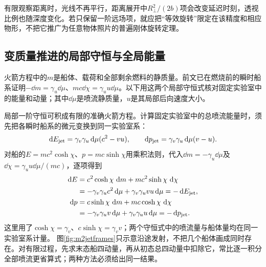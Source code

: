 有限观察距离时，光线不再平行，距离展开中$R_\perp^2/(2b)$项会改变延迟时刻，透视比例也随深度变化。若只保留一阶远场项，就应把“等效旋转”限定在该精度和相应物形，不把它推广为任意物体照片的普遍刚体旋转定理。

\subsection{变质量推进的局部守恒与全局能量}
火箭方程中的$m$是船体、载荷和全部剩余燃料的静质量。前文已在燃烧前的瞬时船系证明$-\dd m=\gamma_u\dd\mu$、$mc\dd\chi=\gamma_u u\dd\mu$。以下用这两个局部守恒式核对固定实验室中的能量和动量；其中$\dd\mu$是喷流静质量，$u$是其局部后向速度大小。

局部一阶守恒可积成有限的准确火箭方程。计算固定实验室中的总喷流能量时，须先把各瞬时船系的微元变换到同一实验室系：
\[
 \mathop{}\!\mathrm d E_{\rm jet}=\gamma_v\gamma_u\mathop{}\!\mathrm d\mu(c^2-vu),\qquad
 \mathop{}\!\mathrm d p_{\rm jet}=\gamma_v\gamma_u\mathop{}\!\mathrm d\mu(v-u).
\]
对船的$E=mc^2\cosh\chi$、$p=mc\sinh\chi$用乘积法则，代入$\dd m=-\gamma_u\dd\mu$及$\dd\chi=\gamma_u u\dd\mu/(mc)$，逐项得到
\begin{align*}
 \dd E&=c^2\cosh\chi\,\dd m+mc^2\sinh\chi\,\dd\chi\\
 &=-\gamma_v\gamma_u c^2\dd\mu
   +\gamma_v\gamma_u vu\dd\mu=-\dd E_{\rm jet},\\
 \dd p&=c\sinh\chi\,\dd m+mc\cosh\chi\,\dd\chi\\
 &=-\gamma_v\gamma_u v\dd\mu
   +\gamma_v\gamma_u u\dd\mu=-\dd p_{\rm jet}.
\end{align*}
这里用了$\cosh\chi=\gamma_v$、$c\sinh\chi=\gamma_vv$；两个守恒式中的喷流量与船体量均在同一实验室系计量。
图\ref{fig:m2jetframes}只示意沿途发射，不把几个船体画成同时存在。对有限过程，先求末态船四动量，再从初态总四动量中扣除它，常比逐一积分全部喷流更省算式；两种方法必须给出同一结果。
